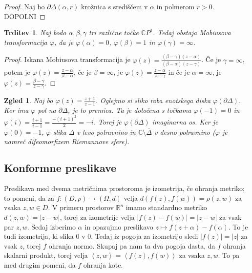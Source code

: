\documentclass[10pt, a4paper]{article}
\newtheorem{trditev}[izr]{Trditev}
\newtheorem{zgled}{Zgled}[section]
\newenvironment{noticeC}{%
  \tcolorbox[%
  notitle,
  empty,
  enhanced,  %
  breakable,
  coltext=black, 
  fontupper=\rmfamily,
  parbox=false,
  noparskip,
  sharp corners,
  boxrule=-1pt,  %
  frame hidden,
  left=7pt,  %
  right=7pt,
  top=5pt,
  bottom=5pt,
  before skip=2.5ex plus 2pt,
  after skip=2.5ex plus 2pt,
  overlay unbroken and last={%
  },
  ]}
{\endtcolorbox}
\newenvironment{dokaz}%
  {\begin{noticeC}\begin{proof}}%
  {\end{proof}\end{noticeC}}
\newcommand{\R}{\mathbb {R}}
\newcommand{\C}{\mathbb {C}}
\newcommand{\sprod}[2]{\left\langle {#1},{#2} \right\rangle}
\begin{document}
\begin{dokaz}
  Naj bo $\partial \Delta (\alpha, r)$ krožnica s središčem v $\alpha$ in polmerom $r > 0$.
  DOPOLNI
\end{dokaz}

\begin{trditev}
  Naj bodo $\alpha, \beta, \gamma$ tri različne točke $\C P^1$. Tedaj obstaja Mobiusova transformacija $\varphi$,
  da je $\varphi(\alpha) = 0$, $\varphi(\beta) = 1$ in $\varphi(\gamma) = \infty$.
\end{trditev}

\begin{dokaz}
  Iskana Mobiusova transformacija je $\varphi(z) = \frac{(\beta - \gamma) (z - \alpha)}{(\beta - \alpha)(z - \gamma)}$.
  Če je $\gamma = \infty$, potem je $\varphi(z) = \frac{z - \alpha}{\beta - \alpha}$,
  če je $\beta = \infty$, je $\varphi(z) = \frac{z - \alpha}{z - \gamma}$ in če je 
  $\alpha = \infty$, je $\varphi(z) = \frac{\beta - \gamma}{z - \gamma}.$
\end{dokaz}

\begin{zgled}
  Naj bo $\varphi(z) = \frac{z + 1}{z - 1}$. Oglejmo si sliko roba enotskega diska 
  $\varphi(\partial \Delta)$. Ker ima $\varphi$ pol na $\partial \Delta$, je to premica.
  Ta je določena s točkama $\varphi(-1) = 0$ in $\varphi(i) = \frac{i + 1}{i - 1} = \frac{-(i + 1)^2}{2} = -i$.
  Torej je $\varphi(\partial \Delta)$ imaginarna os. Ker je $\varphi (0) = -1$, $\varphi$ slika $\Delta$
  v levo polravnino in $\C \setminus \overline{\Delta}$ v desno polravnino 
  ($\varphi$ je namreč difeomorfizem Riemannove sfere).
\end{zgled}

\subsection{Konformne preslikave}

Preslikava med dvema metričnima prostoroma je izometrija, če ohranja metriko;
to pomeni, da za $f: (D, \rho) \to (\Omega, d)$ velja $d(f(z), f(w)) = \rho(z, w)$ za vsaka $z, w \in D$.
V primeru prostorov $\R^n$ imamo standardno metriko $d(z, w) = |z - w|$,
torej za izometrije velja $|f(z) - f(w)| = |z - w|$ za vsak par $z, w$.
Sedaj izberimo $\alpha$ in opazujmo preslikavo $z \mapsto f(z + \alpha) - f(\alpha)$.
To je tudi izometrija, ki slika $0$ v $0$. Tedaj iz pogoja za izometrijo sledi 
$|f(z)| = |z|$ za vsak $z$, torej $f$ ohranja normo. Skupaj pa nam ta dva pogoja dasta,
da $f$ ohranja skalarni produkt, torej velja $\sprod{z}{w} = \sprod{f(z)}{f(w)}$ za vsaka $z, w$.
To pa med drugim pomeni, da $f$ ohranja kote.
\end{document}

